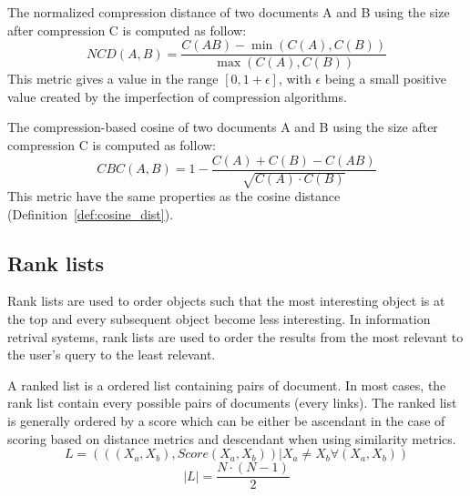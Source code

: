 \begin{definition}
  The normalized compression distance of two documents A and B using the size after compression C is computed as follow:
  \begin{equation}
    NCD(A, B) = \frac{C(AB) - \min(C(A), C(B))}{\max(C(A), C(B))}
  \end{equation}
  This metric gives a value in the range $\left[0, 1+\epsilon\right]$, with $\epsilon$ being a small positive value created by the imperfection of compression algorithms.
\end{definition}

\begin{definition}
  The compression-based cosine of two documents A and B using the size after compression C is computed as follow:
  \begin{equation}
    CBC(A, B) = 1 - \frac{C(A) + C(B) - C(AB)}{\sqrt{C(A) \cdot C(B)}}
  \end{equation}
  This metric have the same properties as the cosine distance (Definition~\ref{def:cosine_dist}).
\end{definition}

\subsection{Rank lists}

Rank lists are used to order objects such that the most interesting object is at the top and every subsequent object become less interesting.
In information retrival systems, rank lists are used to order the results from the most relevant to the user's query to the least relevant.

\begin{definition}
  A ranked list is a ordered list containing pairs of document.
  In most cases, the rank list contain every possible pairs of documents (every links).
  The ranked list is generally ordered by a score which can be either be ascendant in the case of scoring based on distance metrics and descendant when using similarity metrics.
  \begin{equation}
    L = (((X_a, X_b), Score(X_a, X_b)) | X_a \neq X_b \forall (X_a, X_b))
  \end{equation}
  \begin{equation}
    |L| = \frac{N \cdot (N - 1)}{2}
  \end{equation}
\end{definition}

